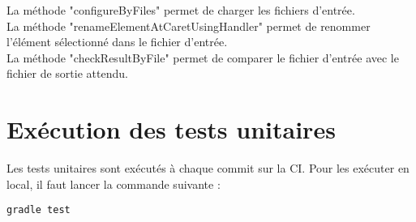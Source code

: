 \noindent La méthode "configureByFiles" permet de charger les fichiers d'entrée.
\\ La méthode "renameElementAtCaretUsingHandler" permet de renommer l'élément sélectionné dans le fichier d'entrée.
\\ La méthode "checkResultByFile" permet de comparer le fichier d'entrée avec le fichier de sortie attendu.

\section{Exécution des tests unitaires}

\noindent Les tests unitaires sont exécutés à chaque commit sur la CI.
\newdoubleline Pour les exécuter en local, il faut lancer la commande suivante :
\begin{lstlisting}[caption={Lancement des tests}, label={lst:run_tests}]
    gradle test
\end{lstlisting}

